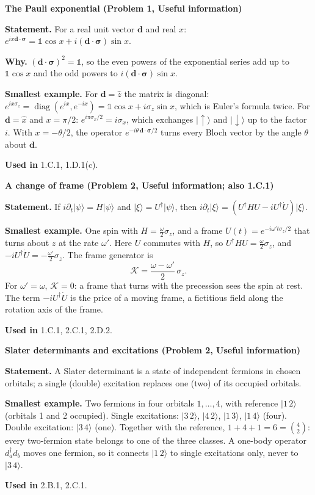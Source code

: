 \documentclass[11pt,a4paper]{article}
\newcommand{\ket}[1]{\lvert #1\rangle}
\newcommand{\smallheading}[1]{\par\Needspace{6\baselineskip}\medskip\textbf{#1}\par}
\newcommand{\id}{\mathds 1}
\begin{document}
\smallheading{The Pauli exponential (Problem 1, Useful information)}
\textbf{Statement.} For a real unit vector $\bm d$ and real $x$: $e^{ix\bm d\cdot\bm\sigma}=\id\cos x+i(\bm d\cdot\bm\sigma)\sin x$.\par
\textbf{Why.} $(\bm d\cdot\bm\sigma)^2=\id$, so the even powers of the exponential series add up to $\id\cos x$ and the odd powers to $i(\bm d\cdot\bm\sigma)\sin x$.\par
\textbf{Smallest example.} For $\bm d=\hat z$ the matrix is diagonal: $e^{ix\sigma_z}=\operatorname{diag}(e^{ix},e^{-ix})=\id\cos x+i\sigma_z\sin x$, which is Euler's formula twice. For $\bm d=\hat x$ and $x=\pi/2$: $e^{i\pi\sigma_x/2}=i\sigma_x$, which exchanges $\ket\uparrow$ and $\ket\downarrow$ up to the factor $i$. With $x=-\theta/2$, the operator $e^{-i\theta\,\bm d\cdot\bm\sigma/2}$ turns every Bloch vector by the angle $\theta$ about $\bm d$.\par
\textbf{Used in} 1.C.1, 1.D.1(c).

\smallheading{A change of frame (Problem 2, Useful information; also 1.C.1)}
\textbf{Statement.} If $i\partial_t\ket\psi=H\ket\psi$ and $\ket\xi=U^\dagger\ket\psi$, then $i\partial_t\ket\xi=(U^\dagger HU-iU^\dagger\dot U)\ket\xi$.\par
\textbf{Smallest example.} One spin with $H=\frac\omega2\sigma_z$, and a frame $U(t)=e^{-i\omega' t\sigma_z/2}$ that turns about $z$ at the rate $\omega'$. Here $U$ commutes with $H$, so $U^\dagger HU=\frac\omega2\sigma_z$, and $-iU^\dagger\dot U=-\frac{\omega'}2\sigma_z$. The frame generator is
\[
\mathcal K=\frac{\omega-\omega'}{2}\,\sigma_z .
\]
For $\omega'=\omega$, $\mathcal K=0$: a frame that turns with the precession sees the spin at rest. The term $-iU^\dagger\dot U$ is the price of a moving frame, a fictitious field along the rotation axis of the frame.\par
\textbf{Used in} 1.C.1, 2.C.1, 2.D.2.

\smallheading{Slater determinants and excitations (Problem 2, Useful information)}
\textbf{Statement.} A Slater determinant is a state of independent fermions in chosen orbitals; a single (double) excitation replaces one (two) of its occupied orbitals.\par
\textbf{Smallest example.} Two fermions in four orbitals $1,\dots,4$, with reference $\ket{1\,2}$ (orbitals 1 and 2 occupied). Single excitations: $\ket{3\,2}$, $\ket{4\,2}$, $\ket{1\,3}$, $\ket{1\,4}$ (four). Double excitation: $\ket{3\,4}$ (one). Together with the reference, $1+4+1=6=\binom42$: every two-fermion state belongs to one of the three classes. A one-body operator $d_a^\dagger d_b$ moves one fermion, so it connects $\ket{1\,2}$ to single excitations only, never to $\ket{3\,4}$.\par
\textbf{Used in} 2.B.1, 2.C.1.
\end{document}
